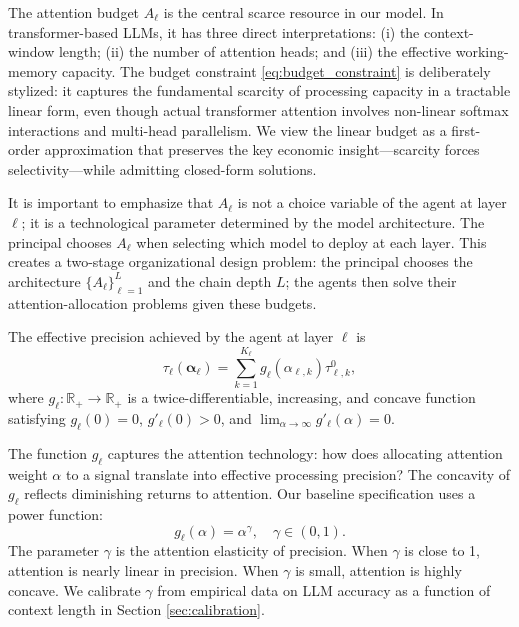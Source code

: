 The attention budget $A_\ell$ is the central scarce resource in our model. In transformer-based LLMs, it has three direct interpretations: (i) the context-window length; (ii) the number of attention heads; and (iii) the effective working-memory capacity. The budget constraint \eqref{eq:budget_constraint} is deliberately stylized: it captures the fundamental scarcity of processing capacity in a tractable linear form, even though actual transformer attention involves non-linear softmax interactions and multi-head parallelism. We view the linear budget as a first-order approximation that preserves the key economic insight---scarcity forces selectivity---while admitting closed-form solutions.

It is important to emphasize that $A_\ell$ is not a choice variable of the agent at layer $\ell$; it is a technological parameter determined by the model architecture. The principal chooses $A_\ell$ when selecting which model to deploy at each layer. This creates a two-stage organizational design problem: the principal chooses the architecture $\{A_\ell\}_{\ell=1}^L$ and the chain depth $L$; the agents then solve their attention-allocation problems given these budgets.

\begin{assumption}\label{ass:attention_technology}
The effective precision achieved by the agent at layer $\ell$ is
\begin{equation}\label{eq:effective_precision}
\tau_\ell(\boldsymbol{\alpha}_\ell) = \sum_{k=1}^{K_\ell} g_\ell(\alpha_{\ell,k}) \tau^0_{\ell,k},
\end{equation}
where $g_\ell : \mathbb{R}_+ \to \mathbb{R}_+$ is a twice-differentiable, increasing, and concave function satisfying $g_\ell(0) = 0$, $g'_\ell(0) > 0$, and $\lim_{\alpha \to \infty} g'_\ell(\alpha) = 0$.
\end{assumption}

The function $g_\ell$ captures the attention technology: how does allocating attention weight $\alpha$ to a signal translate into effective processing precision? The concavity of $g_\ell$ reflects diminishing returns to attention. Our baseline specification uses a power function:
\begin{equation}\label{eq:power_function}
g_\ell(\alpha) = \alpha^\gamma, \quad \gamma \in (0,1).
\end{equation}
The parameter $\gamma$ is the attention elasticity of precision. When $\gamma$ is close to 1, attention is nearly linear in precision. When $\gamma$ is small, attention is highly concave. We calibrate $\gamma$ from empirical data on LLM accuracy as a function of context length in Section \ref{sec:calibration}.

